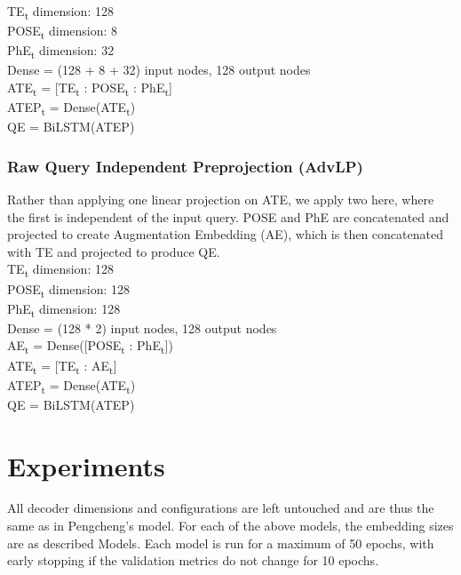 \documentclass{IEEEtran}
\begin{document}
        \hspace*{-3.5mm}TE\textsubscript{t} dimension: 128 \\
        POSE\textsubscript{t} dimension: 8 \\
        PhE\textsubscript{t} dimension: 32 \\
        Dense = (128 + 8 + 32) input nodes, 128 output nodes \\ 

        \hspace*{-3.5mm}ATE\textsubscript{t} = [TE\textsubscript{t} : 
        POSE\textsubscript{t} : PhE\textsubscript{t}] \\
        ATEP\textsubscript{t} = Dense(ATE\textsubscript{t}) \\
        QE = BiLSTM(ATEP) \\

        \subsubsection{Raw Query Independent Preprojection (AdvLP)}
        Rather than applying one linear projection on ATE, we apply two here, where the first is 
        independent of the input query. POSE and PhE are concatenated and projected to create
        Augmentation Embedding (AE), which is then concatenated with TE and projected to produce
        QE. \\

        \hspace*{-3.5mm}TE\textsubscript{t} dimension: 128 \\
        POSE\textsubscript{t} dimension: 128 \\
        PhE\textsubscript{t} dimension: 128 \\
        Dense = (128 * 2) input nodes, 128 output nodes \\ 

        \hspace*{-3.5mm}AE\textsubscript{t} = Dense([POSE\textsubscript{t} : 
        PhE\textsubscript{t}]) \\
        ATE\textsubscript{t} = [TE\textsubscript{t} : AE\textsubscript{t}] \\
        ATEP\textsubscript{t} = Dense(ATE\textsubscript{t}) \\
        QE = BiLSTM(ATEP) \\


    \blindtext

    \section{Experiments}
    All decoder dimensions and configurations are left untouched and are thus the same as in
    Pengcheng's model. For each of the above models, the embedding sizes are as described Models.
    Each model is run for a maximum of 50 epochs, with early stopping if the validation
    metrics do not change for 10 epochs.
\end{document}
